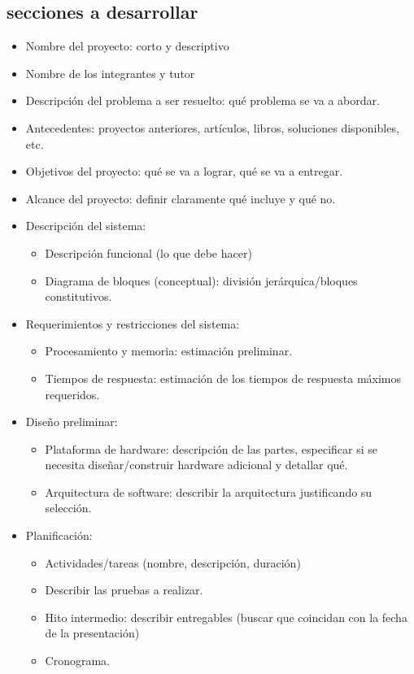 \documentclass[a4paper,12pt]{article}
\begin{document}
\begin{linenumbers}
\subsection{secciones a desarrollar}
\begin{itemize}
  \item Nombre del proyecto: corto y descriptivo
  \item Nombre de los integrantes y tutor
  \item Descripción del problema a ser resuelto: qué problema se va a abordar.
  \item Antecedentes: proyectos anteriores, artículos, libros, soluciones disponibles, etc.
  \item Objetivos del proyecto: qué se va a lograr, qué se va a entregar.
  \item Alcance del proyecto: definir claramente qué incluye y qué no.
  \item Descripción del sistema:
  \begin{itemize}
      \item Descripción funcional (lo que debe hacer)
      \item Diagrama de bloques (conceptual): división jerárquica/bloques constitutivos.
  \end{itemize}
  \item Requerimientos y restricciones del sistema:
  \begin{itemize}
      \item Procesamiento y memoria: estimación preliminar.
      \item Tiempos de respuesta: estimación de los tiempos de respuesta máximos requeridos.
  \end{itemize}
  \item Diseño preliminar:
  \begin{itemize}
      \item Plataforma de hardware: descripción de las partes, especificar si se necesita diseñar/construir hardware adicional y detallar qué.
      \item Arquitectura de software: describir la arquitectura justificando su selección.
  \end{itemize}
  \item Planificación:
  \begin{itemize}
      \item Actividades/tareas (nombre, descripción, duración)
      \item Describir las pruebas a realizar.
      \item Hito intermedio: describir entregables (buscar que coincidan con la fecha de la presentación)
      \item Cronograma.
  \end{itemize}
\end{itemize}



\end{linenumbers}
\end{document}
